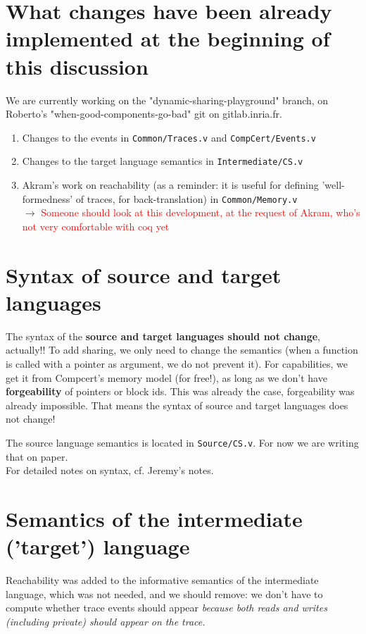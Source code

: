 \documentclass[12pt,a4paper]{article}
\newcommand{\todo}[1]{$\rightarrow$ \textcolor{red}{#1}}
\begin{document}
\section{What changes have been already implemented at the beginning of this discussion}
We are currently working on the "dynamic-sharing-playground" branch, on Roberto's "when-good-components-go-bad" git on gitlab.inria.fr.
\begin{enumerate}
\item Changes to the events in \texttt{Common/Traces.v} and \texttt{CompCert/Events.v}
\item Changes to the target language semantics in \texttt{Intermediate/CS.v}
\item Akram's work on reachability (as a reminder: it is useful for defining 'well-formedness' of traces, for back-translation) in \texttt{Common/Memory.v}\\
\todo{Someone should look at this development, at the request of Akram, who's not 
very comfortable with coq yet}
\end{enumerate}

\section{Syntax of source and target languages}
The syntax of the \textbf{source and target languages should not change}, actually!! 
To add sharing, we only need to change the semantics (when a function is called with 
a pointer as argument, we do not prevent it). For capabilities, we get it from 
Compcert's memory model (for free!), as long as we don't have \textbf{forgeability} of 
pointers or block ids. This was already the case, forgeability was already impossible. 
That means the syntax of source and target languages does not change!


The source language semantics is located 
in \texttt{Source/CS.v}. For now we are writing that on paper.\\
For detailed notes on syntax, cf. Jeremy's notes.

\section{Semantics of the intermediate ('target') language}
Reachability was added to the informative semantics of the 
intermediate language, which was not needed, and we should remove: 
we don't have to compute whether trace events should appear 
\emph{because both reads and writes (including private) should appear on the trace.}
\end{document}
